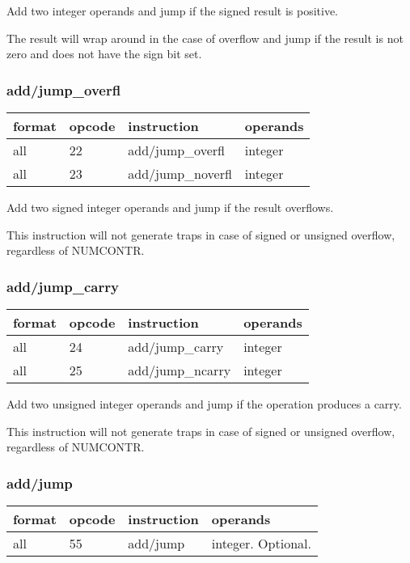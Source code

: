 \documentclass[forwardcom.tex]{subfiles}
\begin{document}
Add two integer operands and jump if the signed result is positive.

The result will wrap around in the case of overflow and jump if the result is not zero and does not have the sign bit set.


\subsubsection{add/jump\_overfl}
\label{table:addJumpOverflInstruction}
\begin{tabular}{|p{16mm}|p{12mm}|p{60mm}|p{50mm}|}
\hline
\bfseries format & \bfseries opcode & \bfseries instruction & \bfseries operands \\ \hline
all & 22 & add/jump\_overfl & integer \\ \hline
all & 23 & add/jump\_noverfl & integer\\ \hline
\end{tabular}
\vspace{2mm}

Add two signed integer operands and jump if the result overflows.
\vspace{2mm}

This instruction will not generate traps in case of signed or unsigned overflow, regardless of  NUMCONTR.
\vspace{2mm}


\subsubsection{add/jump\_carry}
\label{table:addJumpCarryInstruction}
\begin{tabular}{|p{16mm}|p{12mm}|p{60mm}|p{50mm}|}
\hline
\bfseries format & \bfseries opcode & \bfseries instruction & \bfseries operands \\ \hline
all & 24 & add/jump\_carry & integer \\ \hline
all & 25 & add/jump\_ncarry & integer\\ \hline
\end{tabular}
\vspace{2mm}

Add two unsigned integer operands and jump if the operation produces a carry.
\vspace{2mm}

This instruction will not generate traps in case of signed or unsigned overflow, regardless of  NUMCONTR.
\vspace{2mm}


\subsubsection{add/jump}
\label{table:addJumpInstruction}
\begin{tabular}{|p{16mm}|p{12mm}|p{60mm}|p{50mm}|}
\hline
\bfseries format & \bfseries opcode & \bfseries instruction & \bfseries operands \\ \hline
all & 55 & add/jump & integer. Optional. \\ \hline
\end{tabular}
\vspace{2mm}
\end{document}
